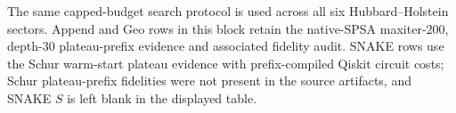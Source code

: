\documentclass[
  reprint,
  amsmath,
  amssymb,
  aps,
  pra,
  nofootinbib,
  superscriptaddress,
  floatfix
]{revtex4-2}
\begin{document}
The same capped-budget search protocol is used across all six Hubbard--Holstein sectors. Append and Geo rows in this block retain the native-SPSA maxiter-200, depth-30 plateau-prefix evidence and associated fidelity audit. SNAKE rows use the Schur warm-start plateau evidence with prefix-compiled Qiskit circuit costs; Schur plateau-prefix fidelities were not present in the source artifacts, and SNAKE \(S\) is left blank in the displayed table.
\par\addvspace{1.0ex}
\clearpage
\end{document}
